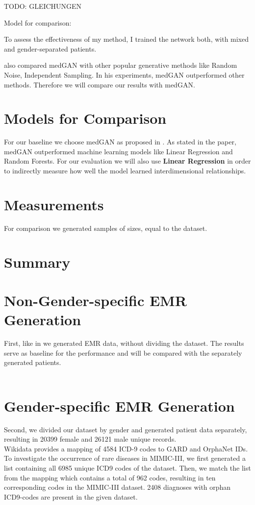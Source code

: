 \documentclass[11pt, a4paper]{book}
\begin{document}
TODO: GLEICHUNGEN

Model for comparison: 

To assess the effectiveness of my method, I trained the network both, with mixed and gender-separated patients. 

\cite{Choi2017} also compared medGAN with other popular generative methods like Random Noise, Independent Sampling. In his experiments, medGAN outperformed other methods. Therefore we will compare our results with medGAN.

\section{Models for Comparison}
For our baseline we choose medGAN as proposed in \cite{Choi2017}. As stated in the paper, medGAN outperformed machine learning models like Linear Regression and Random Forests.
For our evaluation we will also use \textbf{Linear Regression} in order to indirectly measure how well the model learned interdimensional relationships.
\section{Measurements}
For comparison we generated samples of sizes, equal to the dataset.

\section{Summary}

\section{Non-Gender-specific EMR Generation}
First, like in \cite{Choi2017} we generated EMR data, without dividing the dataset. The results serve as baseline for the performance and will be compared with the separately generated patients.
\\
\\



\section{Gender-specific EMR Generation}
Second, we divided our dataset by gender and generated patient data separately, resulting in 20399 female and 26121 male unique records.
\\
Wikidata provides a mapping of 4584 ICD-9 codes to GARD and OrphaNet IDs.
To investigate the occurrence of rare diseases in MIMIC-III, we first generated a list containing all 6985 unique ICD9 codes of the dataset. Then, we match the list from the mapping which contains a total of 962 codes, resulting in ten corresponding codes in the MIMIC-III dataset. 2408 diagnoses with orphan ICD9-codes are present in the given dataset.
\end{document}
